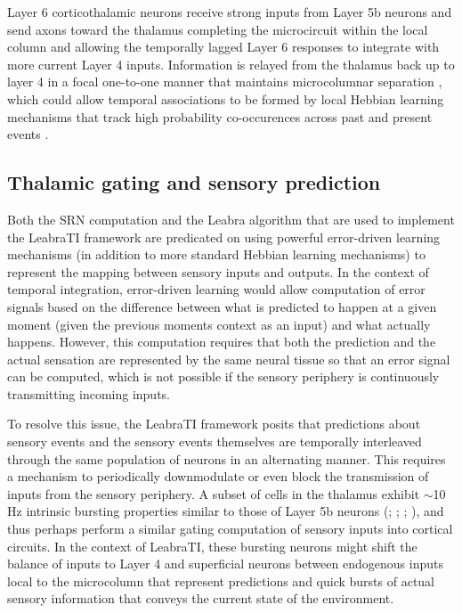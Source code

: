\documentclass[dwyatte_dissertation.tex]{subfiles}
\begin{document}
Layer 6 corticothalamic neurons receive strong inputs from Layer 5b neurons and send axons toward the thalamus completing the microcircuit within the local column and allowing the temporally lagged Layer 6 responses to integrate with more current Layer 4 inputs. Information is relayed from the thalamus back up to layer 4 in a focal one-to-one manner that maintains microcolumnar separation \cite{ShermanGuillery06,Thomson10}, which could allow temporal associations to be formed by local Hebbian learning mechanisms that track high probability co-occurences across past and present events \cite{Foldiak91}.

\subsection{Thalamic gating and sensory prediction}
Both the SRN computation and the Leabra algorithm \cite{OReillyMunakata00,OReillyMunakataFrankEtAl12} that are used to implement the LeabraTI framework are predicated on using powerful error-driven learning mechanisms (in addition to more standard Hebbian learning mechanisms) to represent the mapping between sensory inputs and outputs. In the context of temporal integration, error-driven learning would allow computation of error signals based on the difference between what is predicted to happen at a given moment (given the previous moments context as an input) and what actually happens. However, this computation requires that both the prediction and the actual sensation are represented by the same neural tissue so that an error signal can be computed, which is not possible if the sensory periphery is continuously transmitting incoming inputs. 

To resolve this issue, the LeabraTI framework posits that predictions about sensory events and the sensory events themselves are temporally interleaved through the same population of neurons in an alternating manner. This requires a mechanism to periodically downmodulate or even block the transmission of inputs from the sensory periphery. A subset of cells in the thalamus exhibit $\sim$10 Hz intrinsic bursting properties similar to those of Layer 5b neurons (; ; ; ), and thus perhaps perform a similar gating computation of sensory inputs into cortical circuits. In the context of LeabraTI, these bursting neurons might shift the balance of inputs to Layer 4 and superficial neurons between endogenous inputs local to the microcolumn that represent predictions and quick bursts of actual sensory information that conveys the current state of the environment. 
\end{document}
